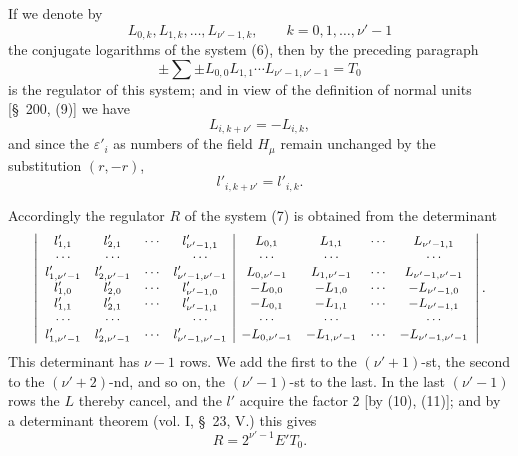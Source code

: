 \documentclass[11pt]{article}
\begin{document}
If we denote by
\begin{equation}
L_{0,k},L_{1,k},\ldots,L_{\nu'-1,k},\qquad k=0,1,\ldots,\nu'-1
\tag{8}
\end{equation}
the conjugate logarithms of the system (6), then by the preceding paragraph
\begin{equation}
\pm\sum\pm L_{0,0}L_{1,1}\cdots L_{\nu'-1,\nu'-1}=T_0
\tag{9}
\end{equation}
is the regulator of this system; and in view of the definition of normal units [\S~200, (9)] we have
\begin{equation}
L_{i,k+\nu'}=-L_{i,k},
\tag{10}
\end{equation}
and since the $\varepsilon'_i$ as numbers of the field $H_\mu$ remain unchanged by the substitution $(r,-r)$,
\begin{equation}
l'_{i,k+\nu'}=l'_{i,k}.
\tag{11}
\end{equation}

Accordingly the regulator $R$ of the system (7) is obtained from the determinant
\[
\small
\left|\begin{array}{cccc|cccc}
l'_{1,1}&l'_{2,1}&\cdots&l'_{\nu'-1,1}&L_{0,1}&L_{1,1}&\cdots&L_{\nu'-1,1}\\
\cdots&\cdots&&\cdots&\cdots&\cdots&&\cdots\\
l'_{1,\nu'-1}&l'_{2,\nu'-1}&\cdots&l'_{\nu'-1,\nu'-1}&L_{0,\nu'-1}&L_{1,\nu'-1}&\cdots&L_{\nu'-1,\nu'-1}\\
l'_{1,0}&l'_{2,0}&\cdots&l'_{\nu'-1,0}&-L_{0,0}&-L_{1,0}&\cdots&-L_{\nu'-1,0}\\
l'_{1,1}&l'_{2,1}&\cdots&l'_{\nu'-1,1}&-L_{0,1}&-L_{1,1}&\cdots&-L_{\nu'-1,1}\\
\cdots&\cdots&&\cdots&\cdots&\cdots&&\cdots\\
l'_{1,\nu'-1}&l'_{2,\nu'-1}&\cdots&l'_{\nu'-1,\nu'-1}&-L_{0,\nu'-1}&-L_{1,\nu'-1}&\cdots&-L_{\nu'-1,\nu'-1}
\end{array}\right|.
\]
This determinant has $\nu-1$ rows. We add the first to the $(\nu'+1)$-st, the second to the $(\nu'+2)$-nd, and so on, the $(\nu'-1)$-st to the last. In the last $(\nu'-1)$ rows the $L$ thereby cancel, and the $l'$ acquire the factor 2 [by (10), (11)]; and by a determinant theorem (vol. I, \S~23, V.) this gives
\begin{equation}
R=2^{\nu'-1}E'T_0.
\tag{12}
\end{equation}
\end{document}
